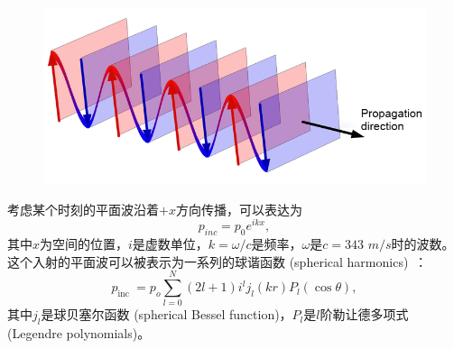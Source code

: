 \begin{figure}[!htbp]
  \centering
    \includegraphics[width=0.7\columnwidth]{figures/plane_wave.png}
  \label{img:plane_wave}
\end{figure}

考虑某个时刻的平面波沿着$+x$方向传播，可以表达为
\begin{equation}
  p_{inc}=p_0 e^{ikx},
\end{equation}
其中$x$为空间的位置，$i$是虚数单位，$k=\omega/c$是频率，$\omega$是$c=343$ $m/s$时的波数。这个入射的平面波可以被表示为一系列的球谐函数 (spherical harmonics)~\cite{rayleigh1896theory}：
\begin{equation}
  p_{\text {inc }}=p_{o} \sum_{l=0}^{N}(2 l+1) i^{l} j_{l}(k r) P_{l}(\cos \theta),
\end{equation}
其中$j_{l}$是球贝塞尔函数 (spherical Bessel function)，$P_{l}$是$l$阶勒让德多项式 (Legendre polynomials)。

